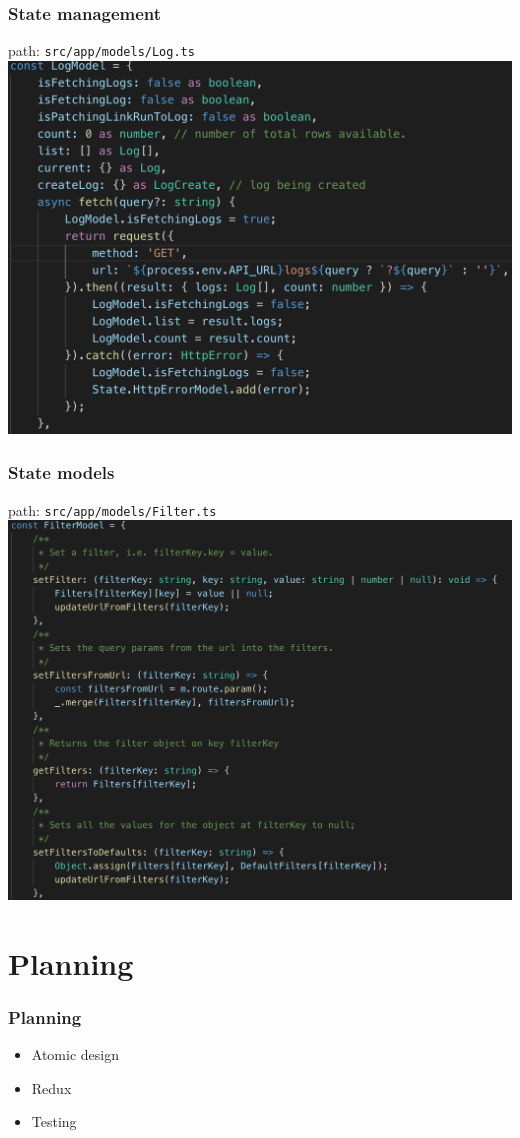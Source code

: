 \documentclass[12pt]{beamer}
\begin{document}
	\begin{frame}
		\frametitle{State management}
		path: \texttt{src/app/models/Log.ts}
		\includegraphics[scale=.4]{../assets/log-model.png}
	\end{frame}

	\begin{frame}
		\frametitle{State models}
		path: \texttt{src/app/models/Filter.ts}
		\includegraphics[scale=.3]{../assets/filter-model.png}
	\end{frame}

	\section{Planning}
	\begin{frame}
		\frametitle{Planning}
		\begin{itemize}
			\item Atomic design
			\item Redux
			\item Testing
		\end{itemize}
	\end{frame}
\end{document}
